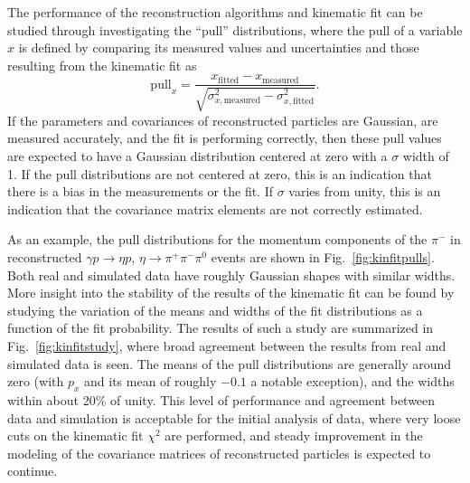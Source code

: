 The performance of the reconstruction algorithms and kinematic fit can be studied through investigating the ``pull'' distributions, where the pull of a variable $x$ is defined by comparing its measured values and uncertainties and those resulting from the kinematic fit as
\begin{equation}
    \text{pull}_x = \frac{x_\text{fitted} - x_\text{measured}}{\sqrt{\sigma_{x,\text{measured}}^2 - \sigma_{x,\text{fitted}}^2}}.
\end{equation}
If the parameters and covariances of reconstructed particles are Gaussian, are measured accurately, and the fit is performing correctly, then these pull values are expected to have a Gaussian distribution centered at zero with a $\sigma$ width of 1.  If the pull distributions are not centered at zero, this is an indication that there is a bias in the measurements or the fit.  If $\sigma$ varies from unity, this is an indication that the covariance matrix elements are not correctly estimated.  

As an example, the pull distributions for the momentum components of the $\pi^-$ in reconstructed $\gamma p \to \eta p$, $\eta \to \pi^+\pi^-\pi^0$ events are shown in Fig.~\ref{fig:kinfitpulls}.  Both real and simulated data have roughly Gaussian shapes with similar widths.  More insight into the stability of the results of the kinematic fit can be found by studying the variation of the means and widths of the fit distributions as a function of the fit probability.  The results of such a study are summarized in Fig.~\ref{fig:kinfitstudy}, where broad agreement between the results from real and simulated data is seen.  The means of the pull distributions are generally around zero (with $p_x$ and its mean of roughly $-0.1$ a notable exception), and the widths within about 20\% of unity.  This level of performance and agreement between data and simulation is acceptable for the initial analysis of data, where very loose cuts on the kinematic fit $\chi^2$ are performed, and steady improvement in the modeling of the covariance matrices of reconstructed particles is expected to continue.


